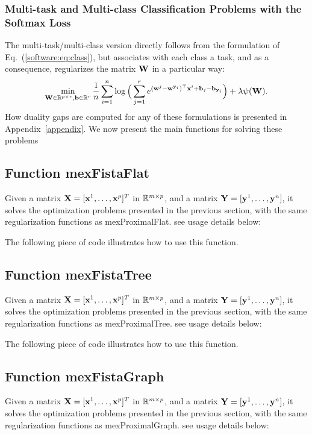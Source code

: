 \documentclass[a4paper, 11pt]{article}
\begin{document}
   \subsubsection{Multi-task and Multi-class Classification Problems with the Softmax Loss}
   The multi-task/multi-class version directly follows from the formulation of Eq.~(\ref{software:eq:class}), but associates with each class a task, and as a consequence, regularizes the matrix ${\mathbf W}$ in a particular way:
   \begin{displaymath}
   \min_{{\mathbf W} \in {\mathbb R}^{p \times r}, {\mathbf b} \in {\mathbb R}^r} \frac{1}{n}\sum_{i=1}^n \log\Big(\sum_{j=1}^r e^{ ({\mathbf w}^j-{\mathbf w}^{{\mathbf y}_i})^\top{\mathbf x}^i + {\mathbf b}_j-{\mathbf b}_{{\mathbf y}_i}}\Big) + \lambda\psi({\mathbf W}).
   \end{displaymath}
   How duality gaps are computed for any of these formulations is presented in Appendix~\ref{appendix}.
   We now present the main functions for solving these problems


\subsection{Function mexFistaFlat}
Given a matrix ${\mathbf X}=[{\mathbf x}^1,\ldots,{\mathbf x}^p]^T$ in ${\mathbb R}^{m \times p}$, and a matrix ${\mathbf Y}=[{\mathbf y}^1,\ldots,{\mathbf y}^n]$, it solves the optimization problems presented in the previous section, with the same regularization functions as mexProximalFlat.
see usage details below:

The following piece of code illustrates how to use this function.


%    

\subsection{Function mexFistaTree}
Given a matrix ${\mathbf X}=[{\mathbf x}^1,\ldots,{\mathbf x}^p]^T$ in ${\mathbb R}^{m \times p}$, and a matrix ${\mathbf Y}=[{\mathbf y}^1,\ldots,{\mathbf y}^n]$, it solves the optimization problems presented in the previous section, with the same regularization functions as mexProximalTree.
see usage details below:

%    

The following piece of code illustrates how to use this function.



\subsection{Function mexFistaGraph}
Given a matrix ${\mathbf X}=[{\mathbf x}^1,\ldots,{\mathbf x}^p]^T$ in ${\mathbb R}^{m \times p}$, and a matrix ${\mathbf Y}=[{\mathbf y}^1,\ldots,{\mathbf y}^n]$, it solves the optimization problems presented in the previous section, with the same regularization functions as mexProximalGraph.
see usage details below:
\end{document}
